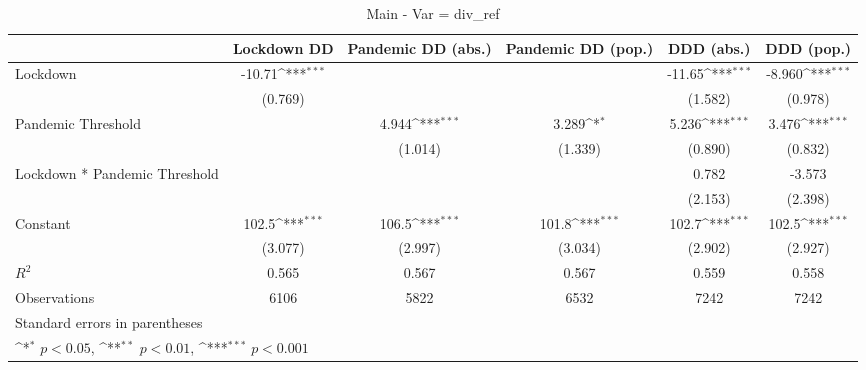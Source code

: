 \documentclass{article}
\begin{document}
{
\def\sym#1{\ifmmode^{#1}\else\(^{#1}\)\fi}
\begin{longtable}{l*{5}{c}}
\caption{Main - Var = div\_ref}\\
\hline\hline\endfirsthead\hline\endhead\hline\endfoot\endlastfoot
                &\multicolumn{1}{c}{Lockdown DD}&\multicolumn{1}{c}{Pandemic DD (abs.)}&\multicolumn{1}{c}{Pandemic DD (pop.)}&\multicolumn{1}{c}{DDD (abs.)}&\multicolumn{1}{c}{DDD (pop.)}\\
\hline
Lockdown        &   -10.71\sym{***}&                  &                  &   -11.65\sym{***}&   -8.960\sym{***}\\
                &  (0.769)         &                  &                  &  (1.582)         &  (0.978)         \\
Pandemic Threshold&                  &    4.944\sym{***}&    3.289\sym{*}  &    5.236\sym{***}&    3.476\sym{***}\\
                &                  &  (1.014)         &  (1.339)         &  (0.890)         &  (0.832)         \\
Lockdown * Pandemic Threshold&                  &                  &                  &    0.782         &   -3.573         \\
                &                  &                  &                  &  (2.153)         &  (2.398)         \\
Constant        &    102.5\sym{***}&    106.5\sym{***}&    101.8\sym{***}&    102.7\sym{***}&    102.5\sym{***}\\
                &  (3.077)         &  (2.997)         &  (3.034)         &  (2.902)         &  (2.927)         \\
\hline
\(R^{2}\)       &    0.565         &    0.567         &    0.567         &    0.559         &    0.558         \\
Observations    &     6106         &     5822         &     6532         &     7242         &     7242         \\
\hline\hline
\multicolumn{6}{l}{\footnotesize Standard errors in parentheses}\\
\multicolumn{6}{l}{\footnotesize \sym{*} \(p<0.05\), \sym{**} \(p<0.01\), \sym{***} \(p<0.001\)}\\
\end{longtable}
}
\end{document}
